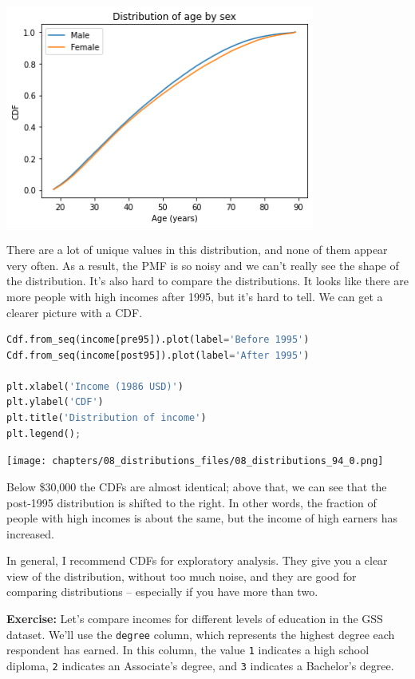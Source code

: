 \begin{center}
\includegraphics[width=4in]{chapters/08_distributions_files/08_distributions_92_0.png}
\end{center}

There are a lot of unique values in this distribution, and none of them
appear very often. As a result, the PMF is so noisy and we can't really
see the shape of the distribution. It's also hard to compare the
distributions. It looks like there are more people with high incomes
after 1995, but it's hard to tell. We can get a clearer picture with a
CDF.

\begin{lstlisting}[language=Python,style=source]
Cdf.from_seq(income[pre95]).plot(label='Before 1995')
Cdf.from_seq(income[post95]).plot(label='After 1995')

plt.xlabel('Income (1986 USD)')
plt.ylabel('CDF')
plt.title('Distribution of income')
plt.legend();
\end{lstlisting}

\begin{center}
\texttt{[image: chapters/08\_distributions\_files/08\_distributions\_94\_0.png]}
\end{center}

Below \$30,000 the CDFs are almost identical; above that, we can see
that the post-1995 distribution is shifted to the right. In other words,
the fraction of people with high incomes is about the same, but the
income of high earners has increased.

In general, I recommend CDFs for exploratory analysis. They give you a
clear view of the distribution, without too much noise, and they are
good for comparing distributions -- especially if you have more than
two.

\textbf{Exercise:} Let's compare incomes for different levels of
education in the GSS dataset. We'll use the
\passthrough{\lstinline!degree!} column, which represents the highest
degree each respondent has earned. In this column, the value
\passthrough{\lstinline!1!} indicates a high school diploma,
\passthrough{\lstinline!2!} indicates an Associate's degree, and
\passthrough{\lstinline!3!} indicates a Bachelor's degree.

